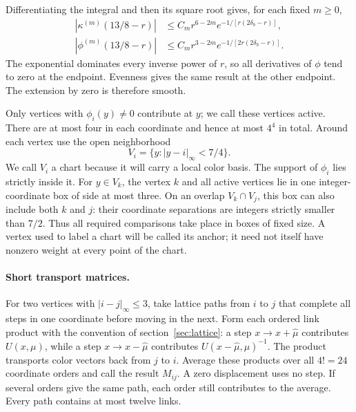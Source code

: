 \documentclass[11pt,a4paper]{article}
\theoremstyle{remark}
\begin{document}
Differentiating the integral and then its square root gives, for each
fixed $m\ge0$,
\begin{equation}
 \begin{split}
 |\kappa^{(m)}(13/8-r)|&\le C_mr^{6-2m}e^{-1/[r(2\delta_b-r)]},\\
 |\phi^{(m)}(13/8-r)|&\le C_mr^{3-2m}e^{-1/[2r(2\delta_b-r)]}.
 \end{split}
\end{equation}
The exponential dominates every inverse power of $r$, so all derivatives
of $\phi$ tend to zero at the endpoint. Evenness gives the same result
at the other endpoint. The extension by zero is therefore smooth.

Only vertices with $\phi_i(y)\ne0$ contribute at $y$; we call these
vertices active. There are at most four in each coordinate and hence
at most $4^4$ in total. Around each vertex use the open neighborhood
\begin{equation}
 V_i=\{y:|y-i|_\infty<7/4\}.
\end{equation}
We call $V_i$ a chart because it will carry a local color basis.
The support of $\phi_i$ lies strictly inside it. For $y\in V_k$,
the vertex $k$ and all active vertices lie in one integer-coordinate
box of side at most three. On an overlap $V_k\cap V_j$, this box can
also include both $k$ and $j$: their coordinate separations are integers
strictly smaller than $7/2$. Thus all required comparisons take place
in boxes of fixed size. A vertex used to label a chart will be called
its anchor; it need not itself have nonzero weight at every point of
the chart.

\paragraph{Short transport matrices.}
For two vertices with $|i-j|_\infty\le3$, take lattice paths from
$i$ to $j$ that complete all steps in one coordinate before moving in
the next. Form each ordered link product with the convention of
section~\ref{sec:lattice}: a step $x\to x+\hat\mu$ contributes
$U(x,\mu)$, while a step $x\to x-\hat\mu$ contributes
$U(x-\hat\mu,\mu)^{-1}$. The product transports color vectors
back from $j$ to $i$. Average these products over all $4!=24$ coordinate
orders and call the result $M_{ij}$. A zero displacement uses no step.
If several orders give the same path, each order still contributes to the
average. Every path contains at most twelve links.
\end{document}
